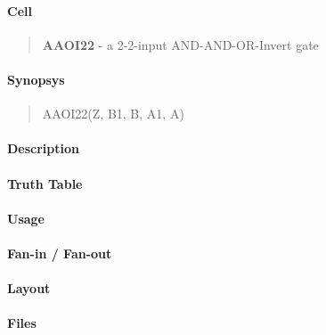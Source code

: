 \label{AAOI22}
\paragraph{Cell}
\begin{quote}
    \textbf{AAOI22} - a 2-2-input AND-AND-OR-Invert gate
\end{quote}

\paragraph{Synopsys}
\begin{quote}
    AAOI22(Z, B1, B, A1, A)
\end{quote}

\paragraph{Description}

%

\paragraph{Truth Table}
%

\paragraph{Usage}

\paragraph{Fan-in / Fan-out}

\paragraph{Layout}

\paragraph{Files}

